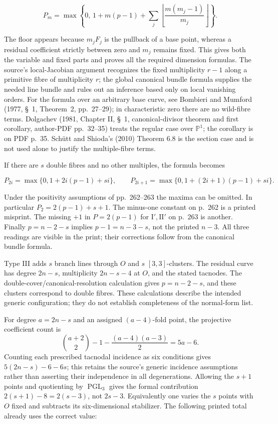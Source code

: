 \[
P_m=\max\left\{0,\,1+m(p-1)+\sum_j
\left\lfloor\frac{m(m_j-1)}{m_j}\right\rfloor\right\}.
\]

The floor appears because \(m_jF_j\) is the pullback of a base point, whereas a residual coefficient strictly between zero and \(m_j\) remains fixed. This gives both the variable and fixed parts and proves all the required dimension formulas. The source's local-Jacobian argument recognizes the fixed multiplicity \(r-1\) along a primitive fibre of multiplicity \(r\); the global canonical bundle formula supplies the needed line bundle and rules out an inference based only on local vanishing orders. For the formula over an arbitrary base curve, see Bombieri and Mumford (1977, \S~1, Theorem~2, pp.~27--29); in characteristic zero there are no wild-fibre terms. Dolgachev (1981, Chapter II, \S~1, canonical-divisor theorem and first corollary, author-PDF pp.~32--35) treats the regular case over \(\mathbb P^1\); the corollary is on PDF p.~35. Schütt and Shioda's (2010) Theorem 6.8 is the section case and is not used alone to justify the multiple-fibre terms.

If there are \(s\) double fibres and no other multiples, the formula becomes

\[
P_{2i}=\max\{0,1+2i(p-1)+si\},\qquad
P_{2i+1}=\max\{0,1+(2i+1)(p-1)+si\}.
\]

Under the positivity assumptions of pp.~262--263 the maxima can be omitted. In particular \(P_2=2(p-1)+s+1\). The minus-one constant on p.~262 is a printed misprint. The missing \(+1\) in \(P=2(p-1)\) for \(\mathrm I',\mathrm{II}'\) on p.~263 is another. Finally \(p=n-2-s\) implies \(p-1=n-3-s\), not the printed \(n-3\). All three readings are visible in the print; their corrections follow from the canonical bundle formula.

Type III adds \(s\) branch lines through \(O\) and \(s\) \([3,3]\)-clusters. The residual curve has degree \(2n-s\), multiplicity \(2n-s-4\) at \(O\), and the stated tacnodes. The double-cover/canonical-resolution calculation gives \(p=n-2-s\), and these clusters correspond to double fibres. These calculations describe the intended generic configuration; they do not establish completeness of the normal-form list.

For degree \(a=2n-s\) and an assigned \((a-4)\)-fold point, the projective coefficient count is
\[
\binom{a+2}{2}-1-\frac{(a-4)(a-3)}2=5a-6.
\]
Counting each prescribed tacnodal incidence as six conditions gives \(5(2n-s)-6-6s\); this retains the source's generic incidence assumptions rather than asserting their independence in all degenerations. Allowing the \(s+1\) points and quotienting by \(\operatorname{PGL}_3\) gives the formal contribution \(2(s+1)-8=2(s-3)\), not \(2s-3\). Equivalently one varies the \(s\) points with \(O\) fixed and subtracts its six-dimensional stabilizer. The following printed total already uses the correct value:

